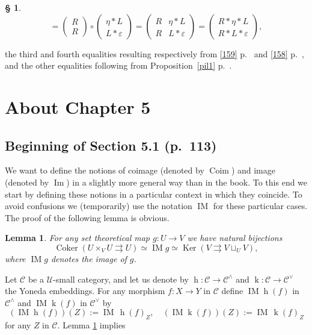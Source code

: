 \documentclass[12pt]{article}%
\newtheorem{lem}[thm]{Lemma}
\theoremstyle{remark}
\theoremstyle{definition}
\newtheorem{s}[thm]{\S}%
\newcommand{\nn}{\noindent}
\newcommand{\C}{\mathcal C}
\newcommand{\U}{\mathcal U}
\newcommand{\ee}{\varepsilon}
\newcommand{\parar}{\rightrightarrows}
\DeclareMathOperator{\Coim}{Coim}
\DeclareMathOperator{\Coker}{Coker}
\DeclareMathOperator{\Ima}{Im}
\DeclareMathOperator{\IM}{IM}
\DeclareMathOperator{\hy}{h}
\DeclareMathOperator{\ky}{k}
\DeclareMathOperator{\Ker}{Ker}
\begin{document}
\begin{s}
$$
=\begin{pmatrix}R\\ R\end{pmatrix}\circ\begin{pmatrix}\eta*L\\ L*\ee\end{pmatrix}
=\begin{pmatrix}R&\eta*L\\ R&L*\ee\end{pmatrix}
=\begin{pmatrix}R*\eta*L\\ R*L*\ee\end{pmatrix},
$$ 

\nn the third and fourth equalities resulting respectively from \eqref{159} p.~\pageref{159} and \eqref{158} p.~\pageref{158}, and the other equalities following from Proposition~\ref{pil1} p.~\pageref{pil1}. 
\end{s}


\section{About Chapter 5}

\subsection{Beginning of Section 5.1 (p.~113)}

We want to define the notions of coimage (denoted by $\Coim$) and image (denoted by $\Ima$) in a slightly more general way than in the book. To this end we start by defining these notions in a particular context in which they coincide. To avoid confusions we (temporarily) use the notation $\IM$ for these particular cases. The proof of the following lemma is obvious. 

\begin{lem}\label{imset} 
For any set theoretical map $g:U\to V$ we have natural bijections 
$$ 
\Coker(U\times_VU\parar U)\simeq\IM g\simeq\Ker(V\parar V\sqcup_UV),
$$ 
where $\IM g$ denotes the image of $g$. 
\end{lem} 

Let $\C$ be a $\U$-small category, and let us denote by $\hy:\C\to\C^\wedge$ and $\ky:\C\to\C^\vee$ the Yoneda embeddings. For any morphism $f:X\to Y$ in $\C$ define $\IM\hy(f)$ in $\C^\wedge$ and $\IM\ky(f)$ in $\C^\vee$ by
$$
(\IM\hy(f))(Z):=\IM\,\hy(f)_Z,\quad(\IM\ky(f))(Z):=\IM\,\ky(f)_Z 
$$
for any $Z$ in $\C$. Lemma \ref{imset} implies
\end{document}
